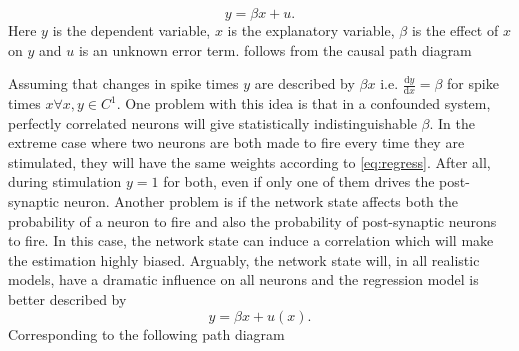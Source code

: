 \documentclass[11pt]{article}
\newcommand{\de}[2]{\frac{\mathrm{d} #1}{\mathrm{d} #2}}
\begin{document}
\begin{equation}
y = \beta x + u.
\label{eq:regress}
\end{equation}
Here $ y $ is the dependent variable, $ x $ is the explanatory variable, $ \beta $ is the effect of $ x$ on $y $ and $ u $ is an unknown error term. 
 follows from the causal path diagram \citep{wright1921correlation,wright1923theory}
\begin{center}
\end{center}
Assuming that changes in spike times $ y $ are described by $ \beta x $ i.e. $ \de{y}{x} = \beta $ for spike times $ x \forall x,y \in C^1$. 
One problem with this idea is that in a confounded system, perfectly correlated neurons will give statistically indistinguishable $ \beta $. 
In the extreme case where two neurons are both made to fire every time they are stimulated, they will have the same weights according to \cref{eq:regress}. 
After all, during stimulation $ y=1 $ for both, even if only one of them drives the post-synaptic neuron. 
Another problem is if the network state affects both the probability of a neuron to fire and also the probability of post-synaptic neurons to fire. 
In this case, the network state can induce a correlation which will make the estimation highly biased. 
Arguably, the network state will, in all realistic models, have a dramatic influence on all neurons and the regression model is better described by
\begin{equation}
y = \beta x + u(x).
\end{equation}
Corresponding to the following path diagram
\end{document}
